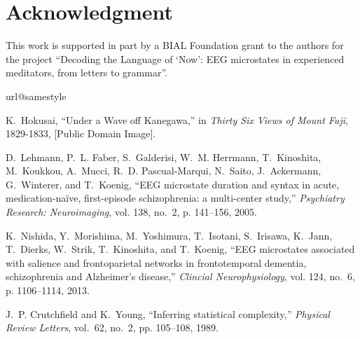 \documentclass[journal]{IEEEtran}
\begin{document}
\section*{Acknowledgment}
\noindent
This work is supported in part by a BIAL Foundation grant to the authors
for the project ``Decoding the Language of `Now': EEG microstates in experienced meditators, from letters to grammar''.

\newpage



\begin{thebibliography}{10}
\providecommand{\url}[1]{#1}
\csname url@samestyle\endcsname
\providecommand{\newblock}{\relax}
\providecommand{\bibinfo}[2]{#2}
\providecommand{\BIBentrySTDinterwordspacing}{\spaceskip=0pt\relax}
\providecommand{\BIBentryALTinterwordstretchfactor}{4}
\providecommand{\BIBentryALTinterwordspacing}{\spaceskip=\fontdimen2\font plus
\BIBentryALTinterwordstretchfactor\fontdimen3\font minus
  \fontdimen4\font\relax}
\providecommand{\BIBforeignlanguage}[2]{{%
\expandafter\ifx\csname l@#1\endcsname\relax
\typeout{** WARNING: IEEEtran.bst: No hyphenation pattern has been}%
\typeout{** loaded for the language `#1'. Using the pattern for}%
\typeout{** the default language instead.}%
\else
\language=\csname l@#1\endcsname
\fi
#2}}
\providecommand{\BIBdecl}{\relax}
\BIBdecl

K.~Hokusai, ``Under a {W}ave off {K}anegawa,'' in \emph{Thirty Six Views of
  Mount Fuji}, 1829-1833, [Public Domain Image].

D.~Lehmann, P.~L. Faber, S.~Galderisi, W.~M. Herrmann, T.~Kinoshita,
  M.~Koukkou, A.~Mucci, R.~D. {Pascual-{M}arqui}, N.~Saito, J.~Ackermann,
  G.~Winterer, and T.~Koenig, ``{E}{E}{G} microstate duration and syntax in
  acute, medication-naïve, first-episode schizophrenia: a multi-center
  study,'' \emph{Psychiatry Research: Neuroimaging}, vol. 138, no.~2, p.
  141–156, 2005.

K.~Nishida, Y.~Morishima, M.~Yoshimura, T.~Isotani, S.~Irisawa, K.~Jann,
  T.~Dierks, W.~Strik, T.~Kinoshita, and T.~Koenig, ``{E}{E}{G} microstates
  associated with salience and frontoparietal networks in frontotemporal
  dementia, schizophrenia and {A}lzheimer’s disease,'' \emph{Clincial
  Neurophysiology}, vol. 124, no.~6, p. 1106–1114, 2013.

J.~P. Crutchfield and K.~Young, ``Inferring statistical complexity,''
  \emph{Physical Review Letters}, vol.~62, no.~2, pp. 105--108, 1989.


\end{thebibliography}
\end{document}
